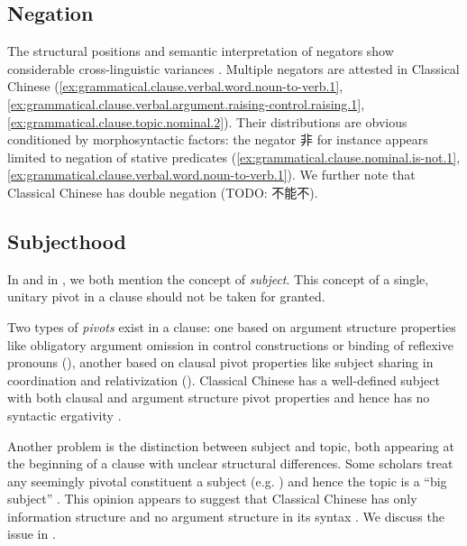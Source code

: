 \documentclass[UTF8, a4paper, oneside, scheme=plain, 12pt]{ctexrep}
\newcommand*{\citepage}[1]{p.~{#1}}
\newcommand*{\term}[1]{\emph{#1}}
\begin{document}
\subsection{Negation}

The structural positions and semantic interpretation of negators show considerable cross-linguistic variances \citep{moscati2012cartography}.
Multiple negators are attested in Classical Chinese (\ref{ex:grammatical.clause.verbal.word.noun-to-verb.1}, \ref{ex:grammatical.clause.verbal.argument.raising-control.raising.1}, \ref{ex:grammatical.clause.topic.nominal.2}).
Their distributions are obvious conditioned by morphosyntactic factors:
the negator 非 for instance appears limited to negation of stative predicates (\ref{ex:grammatical.clause.nominal.is-not.1}, \ref{ex:grammatical.clause.verbal.word.noun-to-verb.1}).
We further note that Classical Chinese has double negation (TODO: 不能不).

\subsection{Subjecthood}\label{sec:grammatical.clause.subject}

In  and in ,
we both mention the concept of \term{subject}.
This concept of a single, unitary pivot in a clause should not be taken for granted.

Two types of \term{pivots} exist in a clause:
one based on argument structure properties like obligatory argument omission in control constructions
or binding of reflexive pronouns
(),
another based on clausal pivot properties like subject sharing in coordination and relativization
().
Classical Chinese has a well-defined subject with both clausal and argument structure pivot properties and hence has no syntactic ergativity \citep{aldridge2008generative}.


Another problem is the distinction between subject and topic,
both appearing at the beginning of a clause with unclear structural differences.
Some scholars treat any seemingly pivotal constituent a subject
(e.g. \citealt[\citepage{41}]{li2004grammar})
and hence the topic is a ``big subject''
\citep[\citepage{42}]{li2004grammar}.
This opinion appears to suggest that Classical Chinese has only information structure and no argument structure in its syntax
\citep[\citepage{122}]{meiguang2018}.
We discuss the issue in .
\end{document}
